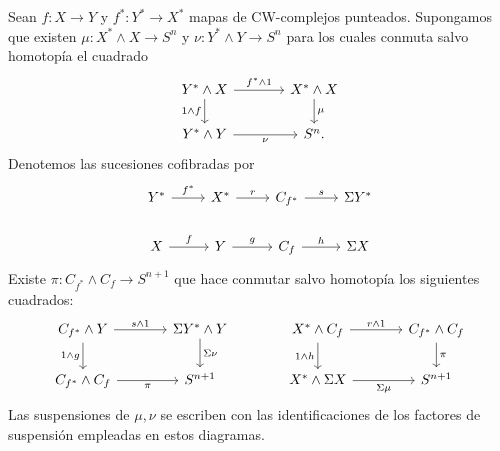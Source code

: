 \begin{lema}\label{lema:c7-producto-conos}
Sean $f\colon X\to Y$ y $f^*\colon Y^*\to X^*$ mapas de CW-complejos punteados. Supongamos que existen $\mu\colon X^*\wedge X\to S^n$ y $\nu\colon Y^*\wedge Y\to S^n$ para los cuales conmuta salvo homotopía el cuadrado
\[
\begin{tikzcd}[column sep=large]
Y^*\wedge X \arrow[r,"f^*\wedge1"] \arrow[d,"1\wedge f"'] & X^*\wedge X \arrow[d,"\mu"]\\
Y^*\wedge Y \arrow[r,"\nu"'] & S^n.
\end{tikzcd}
\]
Denotemos las sucesiones cofibradas por
\[
\begin{tikzcd}
Y^* \arrow[r,"f^*"] & X^* \arrow[r,"r"] & C_{f^*} \arrow[r,"s"] & \Sigma Y^*\\
X \arrow[r,"f"] & Y \arrow[r,"g"] & C_f \arrow[r,"h"] & \Sigma X
\end{tikzcd}
\]
Existe $\pi\colon C_{f^*}\wedge C_f\to S^{n+1}$ que hace conmutar salvo homotopía los siguientes cuadrados:
\[
\begin{tikzcd}[column sep=large]
C_{f^*}\wedge Y \arrow[r,"s\wedge1"] \arrow[d,"1\wedge g"'] & \Sigma Y^*\wedge Y \arrow[d,"\Sigma\nu"] & X^*\wedge C_f \arrow[r,"r\wedge1"] \arrow[d,"1\wedge h"'] & C_{f^*}\wedge C_f \arrow[d,"\pi"]\\
C_{f^*}\wedge C_f \arrow[r,"\pi"'] & S^{n+1} & X^*\wedge\Sigma X \arrow[r,"\Sigma\mu"'] & S^{n+1}
\end{tikzcd}
\]
Las suspensiones de $\mu,\nu$ se escriben con las identificaciones de los factores de suspensión empleadas en estos diagramas.
\end{lema}

